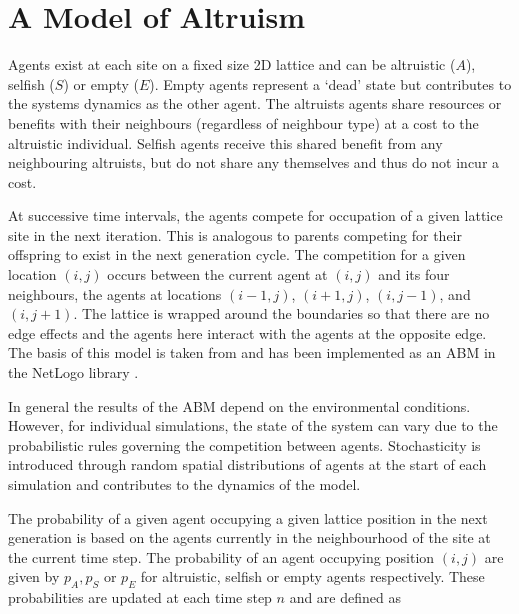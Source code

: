 \documentclass[11pt]{article}
\begin{document}
\section{A Model of Altruism}
\label{sec:model}

Agents exist at each site on a fixed size 2D lattice and can be altruistic ($A$), selfish ($S$) or empty ($E$). Empty agents represent a `dead' state but contributes to the systems dynamics as the other agent. The altruists agents share resources or benefits with their neighbours (regardless of neighbour type) at a cost to the altruistic individual. Selfish agents receive this shared benefit from any neighbouring altruists, but do not share any themselves and thus do not incur a cost.

At successive time intervals, the agents compete for occupation of a given lattice site in the next iteration. This is analogous to parents competing for their offspring to exist in the next generation cycle. The competition for a given location $(i,j)$ occurs between the current agent at $(i,j)$ and its four neighbours, the agents at locations $(i-1,j)$, $(i+1,j)$, $(i,j-1)$, and $(i,j+1)$. The lattice is wrapped around the boundaries so that there are no edge effects and the agents here interact with the agents at the opposite edge. The basis of this model is taken from \cite{Mittleldorf2000} and has been implemented as an ABM in the NetLogo library \cite{Altruism}.

In general the results of the ABM depend on the environmental conditions. However, for individual simulations, the state of the system can vary due to the probabilistic rules governing the competition between agents. Stochasticity is introduced through random spatial distributions of agents at the start of each simulation and contributes to the dynamics of the model. 

The probability of a given agent occupying a given lattice position in the next generation is based on the agents currently in the neighbourhood of the site at the current time step. The probability of an agent occupying position $(i,j)$ are given by $p_A, p_S$ or
$p_E$ for altruistic, selfish or empty agents respectively.
These probabilities are updated at each time step $n$ and are defined as
\end{document}
